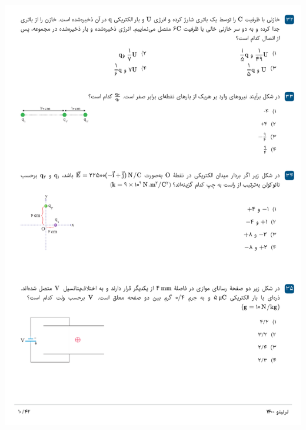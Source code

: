\documentclass{book}
\begin{document}
\includegraphics[width=\textwidth]{"pages/10"}
\end{document}
